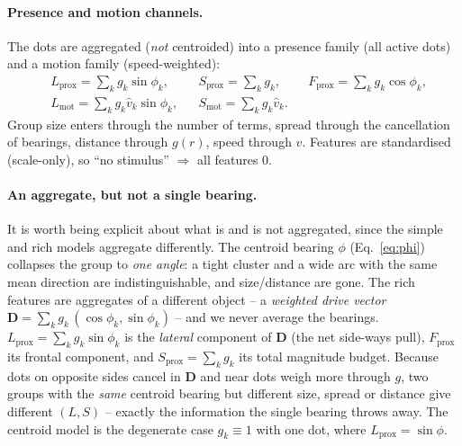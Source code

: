 \documentclass[11pt]{article}
\begin{document}
\paragraph{Presence and motion channels.}
The dots are aggregated (\emph{not} centroided) into a presence family (all active
dots) and a motion family (speed-weighted):
\[
\begin{aligned}
&L_{\text{prox}}=\textstyle\sum_k g_k\sin\phi_k,
& &S_{\text{prox}}=\textstyle\sum_k g_k,
& &F_{\text{prox}}=\textstyle\sum_k g_k\cos\phi_k,\\
&L_{\text{mot}}=\textstyle\sum_k g_k\hat v_k\sin\phi_k,
& &S_{\text{mot}}=\textstyle\sum_k g_k\hat v_k. & &
\end{aligned}
\]
Group size enters through the number of terms, spread through the cancellation of
bearings, distance through $g(r)$, speed through $\hat v$. Features are
standardised (scale-only), so ``no stimulus'' $\Rightarrow$ all features $0$.

\paragraph{An aggregate, but not a single bearing.}
It is worth being explicit about what is and is not aggregated, since the simple
and rich models aggregate differently. The centroid bearing $\phi$
(Eq.~\eqref{eq:phi}) collapses the group to \emph{one angle}: a tight cluster and
a wide arc with the same mean direction are indistinguishable, and size/distance
are gone. The rich features are aggregates of a different object -- a
\emph{weighted drive vector}
$\mathbf D=\sum_k g_k\,(\cos\phi_k,\sin\phi_k)$ -- and we never average the
bearings. $L_{\text{prox}}=\sum_k g_k\sin\phi_k$ is the \emph{lateral} component
of $\mathbf D$ (the net side-ways pull), $F_{\text{prox}}$ its frontal component,
and $S_{\text{prox}}=\sum_k g_k$ its total magnitude budget. Because dots on
opposite sides cancel in $\mathbf D$ and near dots weigh more through $g$, two
groups with the \emph{same} centroid bearing but different size, spread or
distance give different $(L,S)$ -- exactly the information the single bearing
throws away. The centroid model is the degenerate case $g_k\equiv1$ with one dot,
where $L_{\text{prox}}=\sin\phi$.
\end{document}
